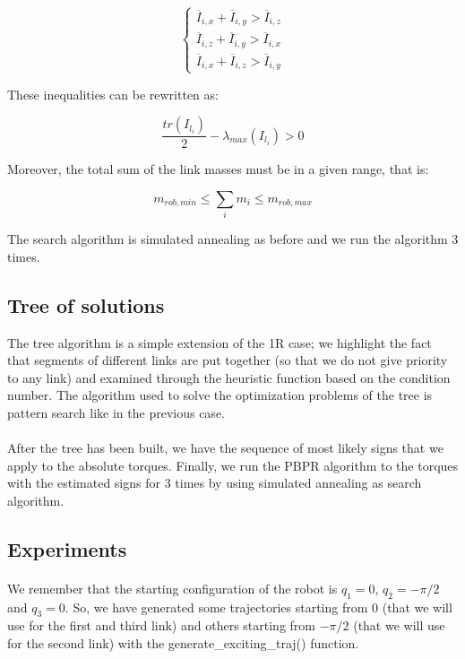 \documentclass{article}
\begin{document}
\[\begin{cases}
\overline{I}_{i,x}+\overline{I}_{i,y} > \overline{I}_{i,z} \\
\overline{I}_{i,z}+\overline{I}_{i,y} > \overline{I}_{i,x} \\
\overline{I}_{i,x}+\overline{I}_{i,z} > \overline{I}_{i,y}
\end{cases}\]

\noindent These inequalities can be rewritten as:

\[\frac{tr(I_{l_i})}{2}-\lambda_{max}(I_{l_i})>0\]

\noindent Moreover, the total sum of the link masses must be in a given range, that is:

\[m_{rob,min}\le \sum_i{m_i} \le m_{rob,max}\]

The search algorithm is simulated annealing as before and we run the algorithm 3 times.

\subsection{Tree of solutions}
The tree algorithm is a simple extension of the 1R case; we highlight the fact that segments of different links are put together (so that we do not give priority to any link) and examined through the heuristic function based on the condition number. The algorithm used to solve the optimization problems of the tree is pattern search like in the previous case.
\\\\
After the tree has been built, we have the sequence of most likely signs that we apply to the absolute torques. Finally, we run the PBPR algorithm to the torques with the estimated signs for 3 times by using simulated annealing as search algorithm.

\subsection{Experiments}
\paragraph{}We remember that the starting configuration of the robot is $q_1 = 0$, $q_2 = -\pi/2$ and $q_3 = 0$. So, we have generated some trajectories starting from 0 (that we will use for the first and third link) and others starting from $-\pi/2$ (that we will use for the second link) with the generate\_exciting\_traj() function.
\end{document}

